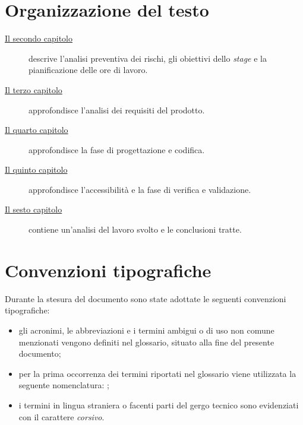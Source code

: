 \section{Organizzazione del testo}

\begin{description}
      \item[{\hyperref[cap:descrizione-stage]{Il secondo capitolo}}] descrive
      l'analisi preventiva dei rischi, gli obiettivi dello \textit{stage} e
      la pianificazione delle ore di lavoro.
      \item[{\hyperref[cap:analisi-requisiti]{Il terzo capitolo}}]
      approfondisce
      l'analisi dei requisiti del prodotto.

      \item[{\hyperref[cap:progettazione-codifica]{Il quarto capitolo}}]
      approfondisce la fase di progettazione e codifica.

      \item[{\hyperref[cap:verifica-validazione]{Il quinto capitolo}}]
      approfondisce l'accessibilità e la fase di verifica e validazione.

      \item[{\hyperref[cap:conclusioni]{Il sesto capitolo}}] contiene
      un’analisi
      del lavoro svolto e le conclusioni tratte.
\end{description}

\section{Convenzioni tipografiche}
\label{sec:convenzioni tipografiche}
Durante la stesura del documento sono state adottate le seguenti convenzioni
tipografiche:
\begin{itemize}
      \item gli acronimi, le abbreviazioni e i termini ambigui o di uso non
            comune menzionati vengono definiti nel glossario, situato alla fine
            del
            presente documento;
      \item per la prima occorrenza dei termini riportati nel glossario viene
            utilizzata la seguente nomenclatura:
            {\color{RoyalBlue}{parola\glsfirstoccur}};
      \item i termini in lingua straniera o facenti parti del gergo tecnico
            sono evidenziati con il carattere \emph{corsivo}.
\end{itemize}